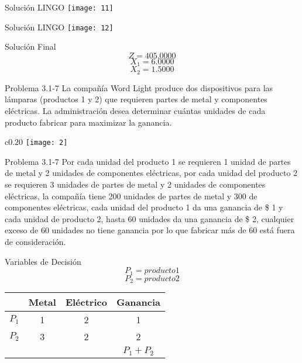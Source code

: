 \documentclass{beamer}
\begin{document}
\begin{frame}[fragile]{Solución LINGO}
\texttt{[image: 11]}
\end{frame}

\begin{frame}[fragile]{Solución LINGO}
    \texttt{[image: 12]}
\end{frame}

\begin{frame}[fragile]{Solución Final}
\[Z = 405.0000\]
\[X_{1} = 6.0000\]
\[X_{2} = 1.5000\]
\end{frame}

\begin{frame}[t,fragile]{Problema 3.1-7 }
La compañía Word Light produce dos dispositivos para las lámparas (productos 1 y 2) que requieren partes de metal y componentes eléctricas. La administración desea determinar cuántas unidades de cada producto fabricar para maximizar la ganancia. 
\begin{wrapfigure}{c}{0.20\textwidth}
    \centering
    \texttt{[image: 2]}
\end{wrapfigure}
\end{frame}
\begin{frame}[t,fragile]{Problema 3.1-7 }
Por cada unidad del producto 1 se requieren 1 unidad de partes de metal y 2 unidades de componentes eléctricas, por cada unidad del producto 2 se requieren 3 unidades de partes de metal y 2 unidades de componentes eléctricas, la compañía tiene 200 unidades de partes de metal y 300 de componentes eléctricas, cada unidad del producto 1 da una ganancia de \$ 1 y cada unidad de producto 2, hasta 60 unidades da una ganancia de \$ 2, cualquier exceso de 60 unidades no tiene ganancia por lo que fabricar más de 60 está fuera de consideración. \\
\end{frame}

\begin{frame}[fragile]{Variables de Decisión}
\[P_{1} = producto 1\]
\[P_{2} = producto 2\]

\begin{tabular}{|c|c|c|c|}
\hline 
  & Metal & Eléctrico & Ganancia \\ 
\hline 
\(P_{1}\) & 1 & 2 & 1 \\ 
\hline 
\(P_{2}\) & 3 & 2 & 2 \\ 
\hline 
 &   &   & \(P_{1} + P_{2}\) \\ 
\hline 
\end{tabular} 

\end{frame}
\end{document}
